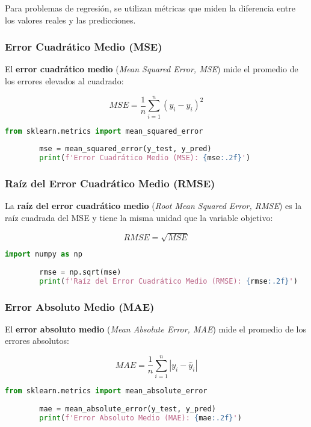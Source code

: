 \documentclass{book}
\begin{document}
	Para problemas de regresión, se utilizan métricas que miden la diferencia entre los valores reales y las predicciones.
	
	\subsubsection{Error Cuadrático Medio (MSE)}
	
	El \textbf{error cuadrático medio} (\textit{Mean Squared Error, MSE}) mide el promedio de los errores elevados al cuadrado:
	
	\[
	MSE = \frac{1}{n} \sum_{i=1}^{n} (y_i - \hat{y}_i)^2
	\]
	
	\begin{lstlisting}[language=Python, caption=Cálculo de MSE en Python]
		from sklearn.metrics import mean_squared_error
		
		mse = mean_squared_error(y_test, y_pred)
		print(f'Error Cuadrático Medio (MSE): {mse:.2f}')
	\end{lstlisting}
	
	\subsubsection{Raíz del Error Cuadrático Medio (RMSE)}
	
	La \textbf{raíz del error cuadrático medio} (\textit{Root Mean Squared Error, RMSE}) es la raíz cuadrada del MSE y tiene la misma unidad que la variable objetivo:
	
	\[
	RMSE = \sqrt{MSE}
	\]
	
	\begin{lstlisting}[language=Python, caption=Cálculo de RMSE]
		import numpy as np
		
		rmse = np.sqrt(mse)
		print(f'Raíz del Error Cuadrático Medio (RMSE): {rmse:.2f}')
	\end{lstlisting}
	
	\subsubsection{Error Absoluto Medio (MAE)}
	
	El \textbf{error absoluto medio} (\textit{Mean Absolute Error, MAE}) mide el promedio de los errores absolutos:
	
	\[
	MAE = \frac{1}{n} \sum_{i=1}^{n} |y_i - \hat{y}_i|
	\]
	
	\begin{lstlisting}[language=Python, caption=Cálculo de MAE]
		from sklearn.metrics import mean_absolute_error
		
		mae = mean_absolute_error(y_test, y_pred)
		print(f'Error Absoluto Medio (MAE): {mae:.2f}')
	\end{lstlisting}
	
\end{document}

